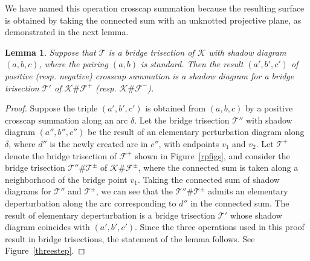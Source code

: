 \documentclass[11pt, oneside]{amsart}
\theoremstyle{theorem}
\newtheorem{lemma}[theorem]{Lemma}
\theoremstyle{definition}
\newcommand{\F}{\mathcal{F}}
\newcommand{\Tt}{\mathcal T}
\newcommand{\K}{\mathcal{K}}
\newcommand{\T}{\mathcal{T}}
\theoremstyle{theorem}
\begin{document}
We have named this operation crosscap summation because the resulting surface is obtained by taking the connected sum with an unknotted projective plane, as demonstrated in the next lemma.

\begin{lemma}\label{crosscapping}
Suppose that $\Tt$ is a bridge trisection of $\K$ with shadow diagram $(a,b,c)$, where the pairing $(a,b)$ is standard.  Then the result $(a',b',c')$ of positive (resp. negative) crosscap summation is a shadow diagram for a bridge trisection $\T'$ of $\K \# \F^+$ (resp. $\K \# \F^-$).
\end{lemma}

\begin{proof}
Suppose the triple $(a',b',c')$ is obtained from $(a,b,c)$ by a positive crosscap summation along an arc $\delta$.  Let the bridge trisection $\T''$ with shadow diagram $(a'',b'',c'')$ be the result of an elementary perturbation diagram along $\delta$, where $d''$ is the newly created arc in $c''$, with endpoints $v_1$ and $v_2$.  Let $\T^+$ denote the bridge trisection of $\F^+$ shown in Figure~\ref{rpfigs}, and consider the bridge trisection $\T'' \# \T^{\pm}$ of $\K \# \F^{\pm}$, where the connected sum is taken along a neighborhood of the bridge point $v_1$.  Taking the connected sum of shadow diagrams for $\T''$ and $\T^{\pm}$, we can see that the $\T'' \# \T^{\pm}$ admits an elementary deperturbation along the arc corresponding to $d''$ in the connected sum.  The result of elementary deperturbation is a bridge trisection $\T'$ whose shadow diagram coincides with $(a',b',c')$.  Since the three operations used in this proof result in bridge trisections, the statement of the lemma follows.  See Figure~\ref{threestep}.
\end{proof}
\end{document}
